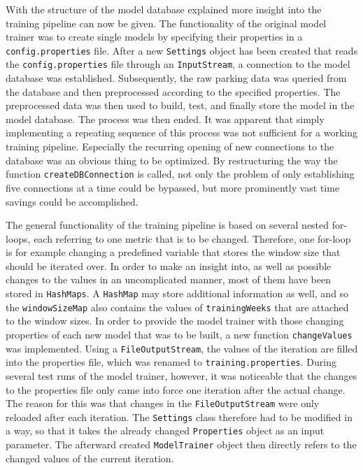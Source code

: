 With the structure of the model database explained more insight into the training pipeline can now be given. The functionality of the original model trainer was to create single models by specifying their properties in a \texttt{config.properties} file. After a new \texttt{Settings} object has been created that reads the \texttt{config.properties} file through an \texttt{InputStream}, a connection to the model database was established. Subsequently, the raw parking data was queried from the database and then preprocessed according to the specified properties. The preprocessed data was then used to build, test, and finally store the model in the model database. The process was then ended. It was apparent that simply implementing a repeating sequence of this process was not sufficient for a working training pipeline. Especially the recurring opening of new connections to the database was an obvious thing to be optimized. By restructuring the way the function \texttt{createDBConnection} is called, not only the problem of only establishing five connections at a time could be bypassed, but more prominently vast time savings could be accomplished. 

The general functionality of the training pipeline is based on several nested for-loops, each referring to one metric that is to be changed. Therefore, one for-loop is for example changing a predefined variable that stores the window size that should be iterated over. In order to make an insight into, as well as possible changes to the values in an uncomplicated manner, most of them have been stored in \texttt{HashMaps}. A \texttt{HashMap} may store additional information as well, and so the \texttt{windowSizeMap} also contains the values of \texttt{trainingWeeks} that are attached to the window sizes. In order to provide the model trainer with those changing properties of each new model that was to be built, a new function \texttt{changeValues} was implemented. Using a \texttt{FileOutputStream}, the values of the iteration are filled into the properties file, which was renamed to \texttt{training.properties}. During several test runs of the model trainer, however, it was noticeable that the changes to the properties file only came into force one iteration after the actual change. The reason for this was that changes in the \texttt{FileOutputStream} were only reloaded after each iteration. The \texttt{Settings} class therefore had to be modified in a way, so that it takes the already changed \texttt{Properties} object as an input parameter. The afterward created \texttt{ModelTrainer} object then directly refers to the changed values of the current iteration. 

